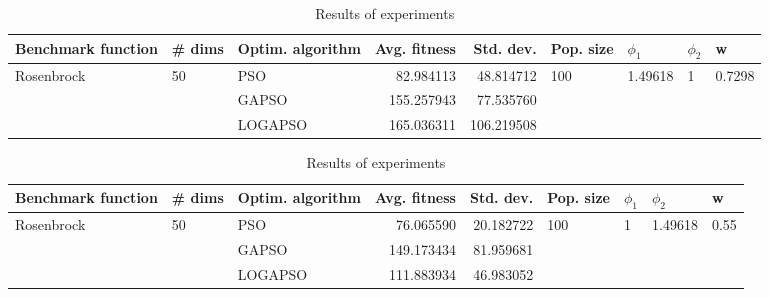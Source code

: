 \documentclass{article}
\begin{document}
\begin{table}
\centering
\caption{Results of experiments}
\begin{tabular}{lllrrllll}
\toprule
         Benchmark function &             \# dims & Optim. algorithm &  Avg. fitness &  Std. dev. &            Pop. size &               $\phi_{1}$ &         $\phi_{2}$ &                       w \\
\midrule
\multirow{3}{*}{Rosenbrock} & \multirow{3}{*}{50} &              PSO &     82.984113 &  48.814712 & \multirow{3}{*}{100} & \multirow{3}{*}{1.49618} & \multirow{3}{*}{1} & \multirow{3}{*}{0.7298} \\
                            &                     &            GAPSO &    155.257943 &  77.535760 &                      &                          &                    &                         \\
                            &                     &          LOGAPSO &    165.036311 & 106.219508 &                      &                          &                    &                         \\
\bottomrule
\end{tabular}
\end{table}
\begin{table}
\centering
\caption{Results of experiments}
\begin{tabular}{lllrrllll}
\toprule
         Benchmark function &             \# dims & Optim. algorithm &  Avg. fitness &  Std. dev. &            Pop. size &         $\phi_{1}$ &               $\phi_{2}$ &                     w \\
\midrule
\multirow{3}{*}{Rosenbrock} & \multirow{3}{*}{50} &              PSO &     76.065590 &  20.182722 & \multirow{3}{*}{100} & \multirow{3}{*}{1} & \multirow{3}{*}{1.49618} & \multirow{3}{*}{0.55} \\
                            &                     &            GAPSO &    149.173434 &  81.959681 &                      &                    &                          &                       \\
                            &                     &          LOGAPSO &    111.883934 &  46.983052 &                      &                    &                          &                       \\
\bottomrule
\end{tabular}
\end{table}
\end{document}
